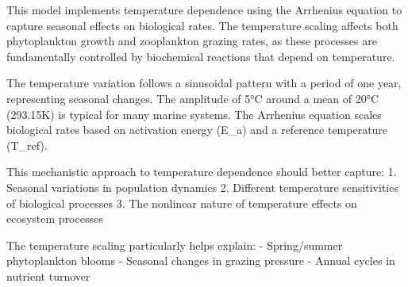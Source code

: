 This model implements temperature dependence using the Arrhenius equation to capture seasonal effects on biological rates. The temperature scaling affects both phytoplankton growth and zooplankton grazing rates, as these processes are fundamentally controlled by biochemical reactions that depend on temperature.

The temperature variation follows a sinusoidal pattern with a period of one year, representing seasonal changes. The amplitude of 5°C around a mean of 20°C (293.15K) is typical for many marine systems. The Arrhenius equation scales biological rates based on activation energy (E_a) and a reference temperature (T_ref).

This mechanistic approach to temperature dependence should better capture:
1. Seasonal variations in population dynamics
2. Different temperature sensitivities of biological processes
3. The nonlinear nature of temperature effects on ecosystem processes

The temperature scaling particularly helps explain:
- Spring/summer phytoplankton blooms
- Seasonal changes in grazing pressure
- Annual cycles in nutrient turnover
